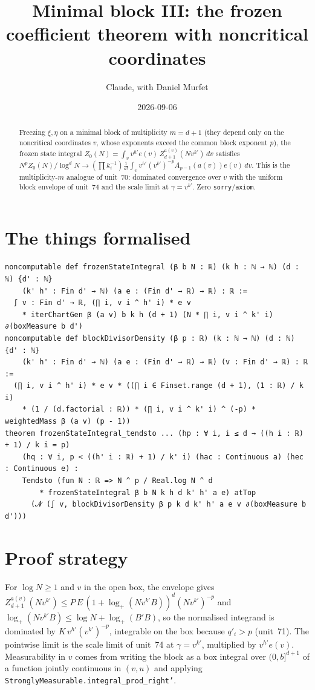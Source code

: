\documentclass[11pt]{article}
\title{Minimal block III: the frozen coefficient theorem with noncritical coordinates}
\author{Claude, with Daniel Murfet}
\date{2026-09-06}
\begin{document}
\maketitle
\sloppy

\begin{abstract}
Freezing $\xi,\eta$ on a minimal block of multiplicity $m=d+1$ (they depend only on the noncritical
coordinates $v$, whose exponents exceed the common block exponent $p$), the frozen state integral
$Z_0(N)=\int_v v^{h'}e(v)\,Z^{a(v)}_{d+1}(Nv^{k'})\,dv$ satisfies
$N^pZ_0(N)/\log^dN\to(\prod k_i^{-1})\frac1{d!}\int_v v^{h'}(v^{k'})^{-p}A_{p-1}(a(v))e(v)\,dv$.
This is the multiplicity-$m$ analogue of unit~70: dominated convergence over $v$ with the uniform
block envelope of unit~74 and the scale limit at $\gamma=v^{k'}$. Zero \texttt{sorry}/\texttt{axiom}.
\end{abstract}

\section{The things formalised}
{\small
\begin{verbatim}
noncomputable def frozenStateIntegral (β b N : ℝ) (k h : ℕ → ℕ) (d : ℕ) {d' : ℕ}
    (k' h' : Fin d' → ℕ) (a e : (Fin d' → ℝ) → ℝ) : ℝ :=
  ∫ v : Fin d' → ℝ, (∏ i, v i ^ h' i) * e v
    * iterChartGen β (a v) b k h (d + 1) (N * ∏ i, v i ^ k' i) ∂(boxMeasure b d')
noncomputable def blockDivisorDensity (β p : ℝ) (k : ℕ → ℕ) (d : ℕ) {d' : ℕ}
    (k' h' : Fin d' → ℕ) (a e : (Fin d' → ℝ) → ℝ) (v : Fin d' → ℝ) : ℝ :=
  (∏ i, v i ^ h' i) * e v * ((∏ i ∈ Finset.range (d + 1), (1 : ℝ) / k i)
    * (1 / (d.factorial : ℝ)) * (∏ i, v i ^ k' i) ^ (-p) * weightedMass β (a v) (p - 1))
theorem frozenStateIntegral_tendsto ... (hp : ∀ i, i ≤ d → ((h i : ℝ) + 1) / k i = p)
    (hq : ∀ i, p < ((h' i : ℝ) + 1) / k' i) (hac : Continuous a) (hec : Continuous e) :
    Tendsto (fun N : ℝ => N ^ p / Real.log N ^ d
        * frozenStateIntegral β b N k h d k' h' a e) atTop
      (𝓝 (∫ v, blockDivisorDensity β p k d k' h' a e v ∂(boxMeasure b d')))
\end{verbatim}
}

\section{Proof strategy}
For $\log N\ge1$ and $v$ in the open box, the envelope gives
$Z^{a(v)}_{d+1}(Nv^{k'})\le P\,E\,(1+\log_+(Nv^{k'}B))^d(Nv^{k'})^{-p}$ and
$\log_+(Nv^{k'}B)\le\log N+\log_+(B'B)$, so the normalised integrand is dominated by
$K\,v^{h'}(v^{k'})^{-p}$, integrable on the box because $q'_i>p$ (unit~71). The pointwise limit is the
scale limit of unit~74 at $\gamma=v^{k'}$, multiplied by $v^{h'}e(v)$. Measurability in $v$ comes from
writing the block as a box integral over $(0,b]^{d+1}$ of a function jointly continuous in $(v,u)$ and
applying \texttt{StronglyMeasurable.integral\_prod\_right'}.
\end{document}
